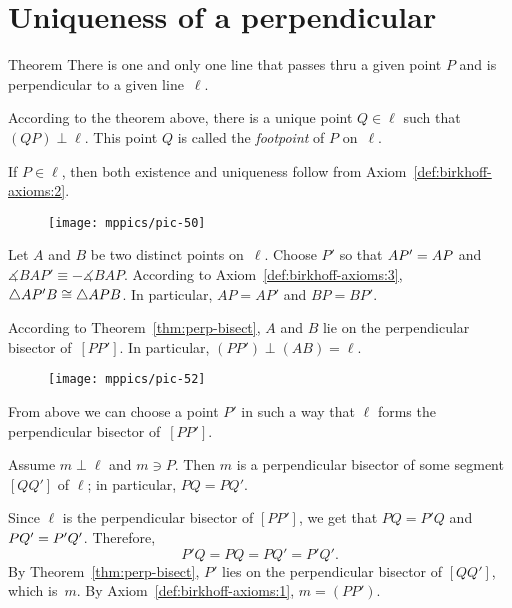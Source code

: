 \section{Uniqueness of a perpendicular}

\begin{thm}[\abs]{Theorem}\label{perp:ex+un}
There is one and only one line that passes thru a given point $P$ and is perpendicular to a given line~$\ell$.
\end{thm}

According to the theorem above, 
there is a unique point $Q\in\ell$ such that $(QP)\perp\ell$.
This point $Q$ is called the \emph{footpoint} of $P$ on~$\ell$. 

If $P\in\ell$, then both existence and uniqueness follow from Axiom~\ref{def:birkhoff-axioms:2}.

{

\begin{wrapfigure}{o}{30mm}
\vskip-4mm
\centering
\texttt{[image: mppics/pic-50]}
\end{wrapfigure}

Let $A$ and $B$ be two distinct points on~$\ell$. 
Choose $P'$ so that $AP'=AP$ and $\measuredangle  BAP' \equiv -\measuredangle   BAP$.
According to Axiom~\ref{def:birkhoff-axioms:3}, $\triangle A P' B\cong\triangle A P B$.
In particular, $A P= A P'$ and $B P= B P'$.

According to Theorem~\ref{thm:perp-bisect}, $A$ and $B$ lie on the perpendicular bisector of~$[P P']$.
In particular, $(P P')\perp (A B)=\ell$.

}

{

\begin{wrapfigure}{r}{44mm}
\centering
\texttt{[image: mppics/pic-52]}
\end{wrapfigure}

From above we can choose a point $P'$ in such a way that $\ell$ forms the perpendicular bisector of~$[PP']$.

Assume $m\perp \ell$ and $m\ni P$.
Then $m$ is a perpendicular bisector of some segment $[Q Q']$ of $\ell$;
in particular, $P Q= P Q'$.

Since $\ell$ is the perpendicular bisector of $[P P']$,
we get that $PQ= P'Q$ and $PQ' = P'Q'$.
Therefore, 
$$P' Q=P Q=P Q'= P' Q'.$$
By Theorem~\ref{thm:perp-bisect}, 
$P'$ lies on the perpendicular bisector of $[QQ']$, which is~$m$.
By Axiom~\ref{def:birkhoff-axioms:1}, $m=(P P')$.
\qeds

}

